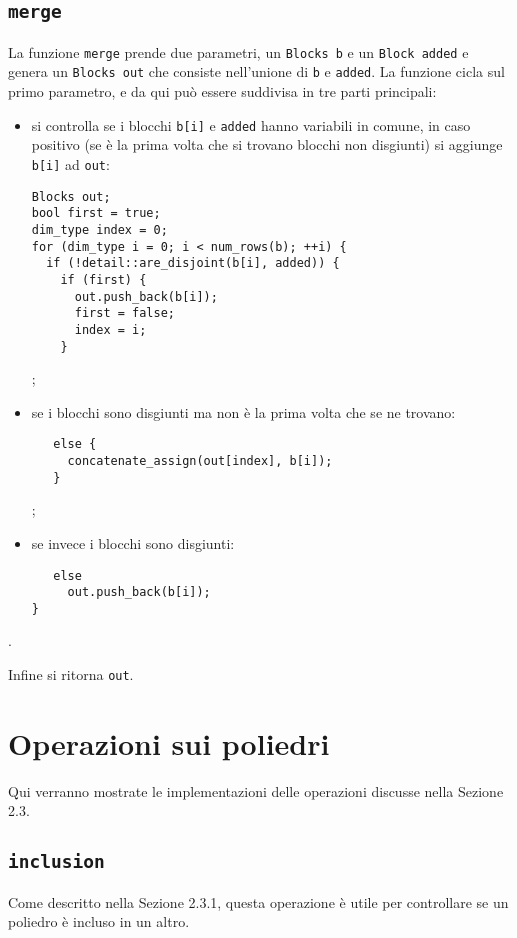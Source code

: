 \documentclass{mimosis}
\theoremstyle{definition}
\begin{document}
\subsection{\texttt{merge}}
\label{sec:orgccecd69}
La funzione \texttt{merge} prende due parametri, un \texttt{Blocks b} e un \texttt{Block added} e
genera un \texttt{Blocks out} che consiste nell'unione di \texttt{b} e \texttt{added}. La funzione
cicla sul primo parametro, e da qui può essere suddivisa in tre parti principali:

\begin{itemize}
\item si controlla se i blocchi \texttt{b[i]} e \texttt{added} hanno variabili in comune, in caso
positivo (se è la prima volta che si trovano blocchi non disgiunti) si
aggiunge \texttt{b[i]} ad \texttt{out}:
\lstset{style=mystyle,language=C++,label= ,caption= ,captionpos=b,numbers=none}
\begin{lstlisting}
Blocks out;
bool first = true;
dim_type index = 0;
for (dim_type i = 0; i < num_rows(b); ++i) {
  if (!detail::are_disjoint(b[i], added)) {
    if (first) {
      out.push_back(b[i]);
      first = false;
      index = i;
    }
\end{lstlisting}
;
\item se i blocchi sono disgiunti ma non è la prima volta che se ne trovano:
\lstset{style=mystyle,language=C++,label= ,caption= ,captionpos=b,numbers=none}
\begin{lstlisting}
   else {
     concatenate_assign(out[index], b[i]);
   }
\end{lstlisting}
;
\item se invece i blocchi sono disgiunti:
\lstset{style=mystyle,language=C++,label= ,caption= ,captionpos=b,numbers=none}
\begin{lstlisting}
   else
     out.push_back(b[i]);
}
\end{lstlisting}
\end{itemize}
.

Infine si ritorna \texttt{out}.
\section{Operazioni sui poliedri}
\label{sec:org8d7e2cf}
Qui verranno mostrate le implementazioni delle operazioni discusse nella Sezione
2.3.

\subsection{\texttt{inclusion}}
\label{sec:org86e7fa2}
Come descritto nella Sezione 2.3.1, questa operazione è utile per controllare se
un poliedro è incluso in un altro.
\end{document}
